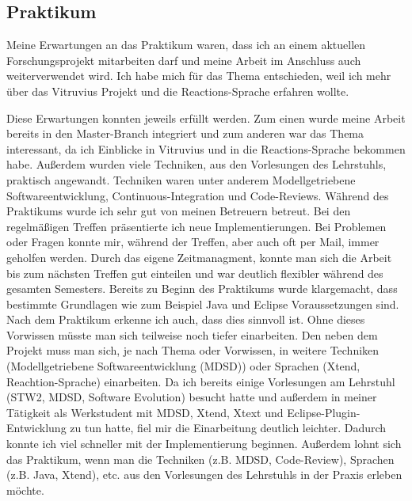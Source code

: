 \documentclass[ngerman,runningheads]{llncs}
\begin{document}
\subsection{Praktikum}
Meine Erwartungen an das Praktikum waren, dass ich an einem aktuellen Forschungsprojekt mitarbeiten darf und meine Arbeit im Anschluss auch weiterverwendet wird. Ich habe mich für das Thema entschieden, weil ich mehr über das Vitruvius Projekt und die Reactions-Sprache erfahren wollte. \par
Diese Erwartungen konnten jeweils erfüllt werden. Zum einen wurde meine Arbeit bereits in den Master-Branch integriert und zum anderen war das Thema interessant, da ich Einblicke in Vitruvius und in die Reactions-Sprache bekommen habe. Außerdem wurden viele Techniken, aus den Vorlesungen des Lehrstuhls, praktisch angewandt. Techniken waren unter anderem Modellgetriebene Softwareentwicklung, Continuous-Integration und Code-Reviews. Während des Praktikums wurde ich sehr gut von meinen Betreuern betreut. Bei den regelmäßigen Treffen präsentierte ich neue Implementierungen. Bei Problemen oder Fragen konnte mir, während der Treffen, aber auch oft per Mail, immer geholfen werden. Durch das eigene Zeitmanagment, konnte man sich die Arbeit bis zum nächsten Treffen gut einteilen und war deutlich flexibler während des gesamten Semesters. Bereits zu Beginn des Praktikums wurde klargemacht, dass bestimmte Grundlagen wie zum Beispiel Java und Eclipse Voraussetzungen sind. Nach dem Praktikum erkenne ich auch, dass dies sinnvoll ist. Ohne dieses Vorwissen müsste man sich teilweise noch tiefer einarbeiten. Den neben dem Projekt muss man sich, je nach Thema oder Vorwissen, in weitere Techniken (Modellgetriebene Softwareentwicklung (MDSD)) oder Sprachen (Xtend, Reachtion-Sprache) einarbeiten. Da ich bereits einige Vorlesungen am Lehrstuhl (STW2, MDSD, Software Evolution) besucht hatte und außerdem in meiner Tätigkeit als Werkstudent mit MDSD, Xtend, Xtext und Eclipse-Plugin-Entwicklung zu tun hatte, fiel mir die Einarbeitung deutlich leichter. Dadurch konnte ich viel schneller mit der Implementierung beginnen.
Außerdem lohnt sich das Praktikum, wenn man die Techniken (z.B. MDSD, Code-Review), Sprachen (z.B. Java, Xtend), etc. aus den Vorlesungen des Lehrstuhls in der Praxis erleben möchte. 
\end{document}
